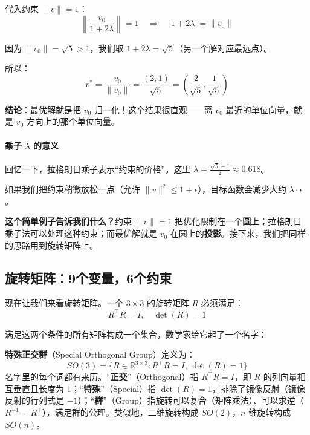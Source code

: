 代入约束 $\|v\| = 1$：
\begin{equation}
\left\| \frac{v_0}{1 + 2\lambda} \right\| = 1 \quad \Rightarrow \quad |1 + 2\lambda| = \|v_0\|
\end{equation}

因为 $\|v_0\| = \sqrt{5} > 1$，我们取 $1 + 2\lambda = \sqrt{5}$（另一个解对应最远点）。

所以：
\begin{equation}
v^* = \frac{v_0}{\|v_0\|} = \frac{(2, 1)}{\sqrt{5}} = \left( \frac{2}{\sqrt{5}}, \frac{1}{\sqrt{5}} \right)
\end{equation}

\textbf{结论}：最优解就是把 $v_0$ 归一化！这个结果很直观——离 $v_0$ 最近的单位向量，就是 $v_0$ 方向上的那个单位向量。

\paragraph{乘子 $\lambda$ 的意义}

回忆一下，拉格朗日乘子表示“约束的价格”。这里 $\lambda = \frac{\sqrt{5} - 1}{2} \approx 0.618$。

如果我们把约束稍微放松一点（允许 $\|v\|^2 \leq 1 + \epsilon$），目标函数会减少大约 $\lambda \cdot \epsilon$。

\begin{insightbox}
\textbf{这个简单例子告诉我们什么？}约束 $\|v\| = 1$ 把优化限制在一个\textbf{圆}上；拉格朗日乘子法可以处理这种约束；而最优解就是 $v_0$ 在圆上的\textbf{投影}。接下来，我们把同样的思路用到旋转矩阵上。
\end{insightbox}

\subsection*{旋转矩阵：9个变量，6个约束}

现在让我们来看旋转矩阵。一个 $3 \times 3$ 的旋转矩阵 $R$ 必须满足：
\begin{equation}
R^\top R = I, \quad \det(R) = 1
\end{equation}

满足这两个条件的所有矩阵构成一个集合，数学家给它起了一个名字：

\begin{definition}[特殊正交群 $SO(3)$]
\textbf{特殊正交群}（Special Orthogonal Group）定义为：
\begin{equation}
SO(3) = \{ R \in \mathbb{R}^{3 \times 3} : R^\top R = I, \, \det(R) = 1 \}
\end{equation}
名字里的每个词都有来历。“\textbf{正交}”（Orthogonal）指 $R^\top R = I$，即 $R$ 的列向量相互垂直且长度为 1；“\textbf{特殊}”（Special）指 $\det(R) = 1$，排除了镜像反射（镜像反射的行列式是 $-1$）；“\textbf{群}”（Group）指旋转可以复合（矩阵乘法）、可以求逆（$R^{-1} = R^\top$），满足群的公理。类似地，二维旋转构成 $SO(2)$，$n$ 维旋转构成 $SO(n)$。
\end{definition}

